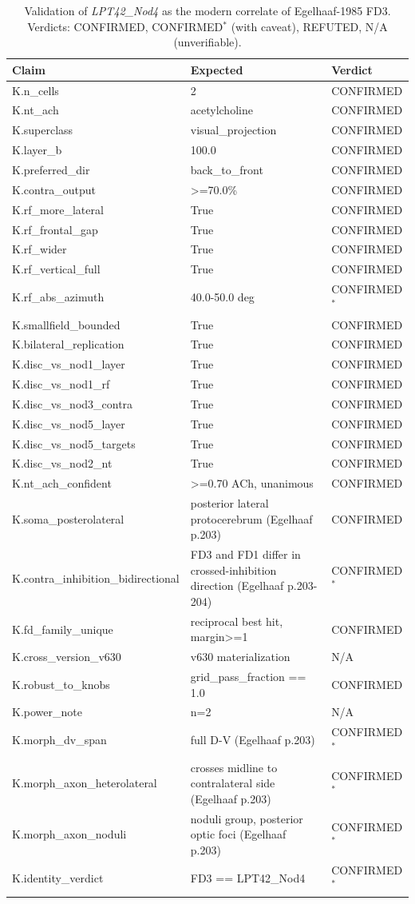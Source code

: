 \begin{table}[t]
\centering\small
\caption{Validation of \textit{LPT42\_Nod4} as the modern correlate of Egelhaaf-1985 FD3. Verdicts: CONFIRMED, CONFIRMED$^{*}$ (with caveat), REFUTED, N/A (unverifiable).}
\begin{tabular}{lll}
\toprule
Claim & Expected & Verdict \\
\midrule
K.n\_cells & 2 & CONFIRMED \\
K.nt\_ach & acetylcholine & CONFIRMED \\
K.superclass & visual\_projection & CONFIRMED \\
K.layer\_b & 100.0 & CONFIRMED \\
K.preferred\_dir & back\_to\_front & CONFIRMED \\
K.contra\_output & >=70.0\% & CONFIRMED \\
K.rf\_more\_lateral & True & CONFIRMED \\
K.rf\_frontal\_gap & True & CONFIRMED \\
K.rf\_wider & True & CONFIRMED \\
K.rf\_vertical\_full & True & CONFIRMED \\
K.rf\_abs\_azimuth & 40.0-50.0 deg & CONFIRMED$^{*}$ \\
K.smallfield\_bounded & True & CONFIRMED \\
K.bilateral\_replication & True & CONFIRMED \\
K.disc\_vs\_nod1\_layer & True & CONFIRMED \\
K.disc\_vs\_nod1\_rf & True & CONFIRMED \\
K.disc\_vs\_nod3\_contra & True & CONFIRMED \\
K.disc\_vs\_nod5\_layer & True & CONFIRMED \\
K.disc\_vs\_nod5\_targets & True & CONFIRMED \\
K.disc\_vs\_nod2\_nt & True & CONFIRMED \\
K.nt\_ach\_confident & >=0.70 ACh, unanimous & CONFIRMED \\
K.soma\_posterolateral & posterior lateral protocerebrum (Egelhaaf p.203) & CONFIRMED \\
K.contra\_inhibition\_bidirectional & FD3 and FD1 differ in crossed-inhibition direction (Egelhaaf p.203-204) & CONFIRMED$^{*}$ \\
K.fd\_family\_unique & reciprocal best hit, margin>=1 & CONFIRMED \\
K.cross\_version\_v630 & v630 materialization & N/A \\
K.robust\_to\_knobs & grid\_pass\_fraction == 1.0 & CONFIRMED \\
K.power\_note & n=2 & N/A \\
K.morph\_dv\_span & full D-V (Egelhaaf p.203) & CONFIRMED$^{*}$ \\
K.morph\_axon\_heterolateral & crosses midline to contralateral side (Egelhaaf p.203) & CONFIRMED$^{*}$ \\
K.morph\_axon\_noduli & noduli group, posterior optic foci (Egelhaaf p.203) & CONFIRMED$^{*}$ \\
K.identity\_verdict & FD3 == LPT42\_Nod4 & CONFIRMED$^{*}$ \\
\bottomrule
\end{tabular}
\end{table}
